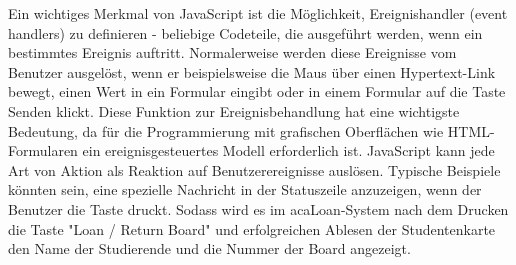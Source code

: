 Ein wichtiges Merkmal von JavaScript ist die Möglichkeit, Ereignishandler (event handlers) zu definieren - beliebige Codeteile, die ausgeführt werden, wenn ein bestimmtes Ereignis auftritt. Normalerweise werden diese Ereignisse vom Benutzer ausgelöst, wenn er beispielsweise die Maus über einen Hypertext-Link bewegt, einen Wert in ein Formular eingibt oder in einem Formular auf die Taste Senden klickt. Diese Funktion zur Ereignisbehandlung hat eine wichtigste Bedeutung, da für die Programmierung mit grafischen Oberflächen wie HTML-Formularen ein ereignisgesteuertes Modell erforderlich ist. JavaScript kann jede Art von Aktion als Reaktion auf Benutzerereignisse auslösen. Typische Beispiele könnten sein, eine spezielle Nachricht in der Statuszeile anzuzeigen, wenn der Benutzer die Taste druckt. Sodass wird es im acaLoan-System nach dem Drucken die Taste "Loan / Return Board" und erfolgreichen Ablesen der Studentenkarte den Name der Studierende und die Nummer der Board angezeigt.

